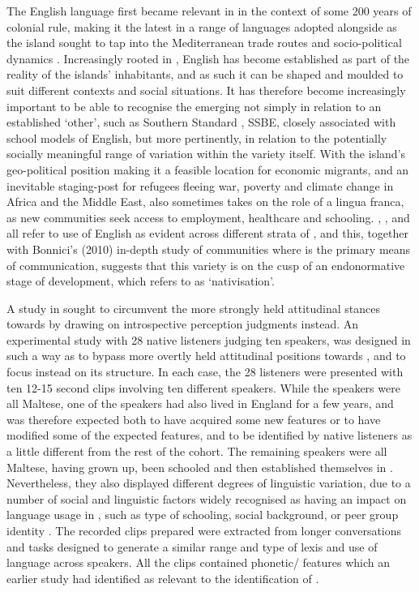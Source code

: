 \documentclass[output=paper]{langsci/langscibook}
\begin{document}
The English language first became relevant in  in the context of some 200 years of colonial rule, making it the latest in a range of languages adopted alongside  as the island sought to tap into the Mediterranean trade routes and socio-political dynamics \citep{Brincat2011}.  Increasingly rooted in , English has become established as part of the  reality of the islands’ inhabitants, and as such it can be shaped and moulded to suit different contexts and social situations. It has therefore become increasingly important to be able to recognise the emerging  not simply in relation to an established ‘other’, such as Southern Standard , SSBE, closely associated with school models of English, but more pertinently, in relation to the potentially socially meaningful range of variation within the variety itself. With the island’s geo-political position making it a feasible location for economic migrants, and an inevitable staging-post for refugees fleeing war, poverty and climate change in Africa and the Middle East,  also sometimes takes on the role of a lingua franca, as new communities seek access to employment, healthcare and schooling. \citet{Thusatetal2009}, \citet{Vella2012}, and \citet{CamilleriGrima2013} all refer to use of English as evident across different strata of , and this, together with Bonnici’s (2010) in-depth  study of communities where  is the primary means of communication, suggests that this variety is on the cusp of an endonormative stage of development, which \citet{Schneider2003} refers to as ‘nativisation’. 

A study in \citet{Grech2015} sought to circumvent the more strongly held attitudinal stances towards  by drawing on introspective perception judgments instead. An experimental study with 28 native  listeners judging ten speakers, was designed in such a way as to bypass more overtly held attitudinal positions towards , and to focus instead on its structure. In each case, the 28 listeners were presented with ten 12-15 second clips involving ten different  speakers. While the speakers were all Maltese, one of the speakers had also lived in England for a few years, and was therefore expected both to have acquired some new features or to have modified some of the expected  features, and to be identified by native  listeners as a little different from the rest of the cohort. The remaining speakers were all Maltese, having grown up, been schooled and then established themselves in . Nevertheless, they also displayed different degrees of linguistic variation, due to a number of social and linguistic factors widely recognised as having an impact on language usage in , such as type of schooling, social background, or peer group identity \citep{Vella2012,CamilleriGrima2013}. The recorded clips prepared were extracted from longer conversations and tasks designed to generate a similar range and type of lexis and use of language across speakers. All the clips contained phonetic/ features which an earlier study \citep{Grech2015} had identified as relevant to the identification of . 
\end{document}
